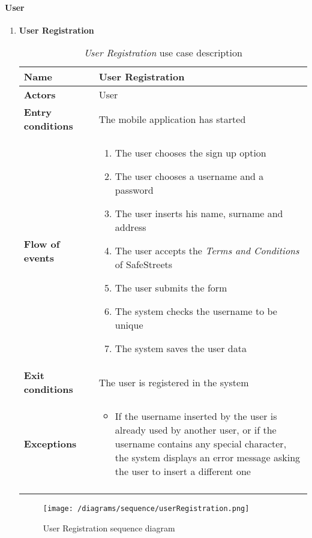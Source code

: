 		\paragraph{User}
		\begin{enumerate}
			\item \textbf{User Registration} 
				\begin{longtable}{p{0.26\linewidth}p{0.75\linewidth}}
					\toprule
					\textbf{Name} & \textbf{User Registration} \\
					\midrule
					\textbf{Actors} & User \\
					\midrule
					\textbf{Entry conditions} & The mobile application has started \\
					\midrule
					\textbf{Flow of events} & 
					\begin{enumerate}
						\item The user chooses the sign up option
						\item The user chooses a username and a password
						\item The user inserts his name, surname and address
						\item The user accepts the \emph{Terms and Conditions} of SafeStreets
						\item The user submits the form
						\item The system checks the username to be unique
						\item The system saves the user data
					\end{enumerate} \\
					\midrule
					\textbf{Exit conditions} & The user is registered in the system\\
					\midrule
					\textbf{Exceptions} & 
					\begin{itemize}
						\item If the username inserted by the user is already used by another user, or if the username contains any special character, the system displays an error message asking the user to insert a different one
					\end{itemize} \\
					\bottomrule
					\caption{\emph{User Registration} use case description}
				\end{longtable}
			
				\begin{figure}[h]
					\centering
					\texttt{[image: /diagrams/sequence/userRegistration.png]}
					\caption{User Registration sequence diagram}
				\end{figure}
				

\end{enumerate}
